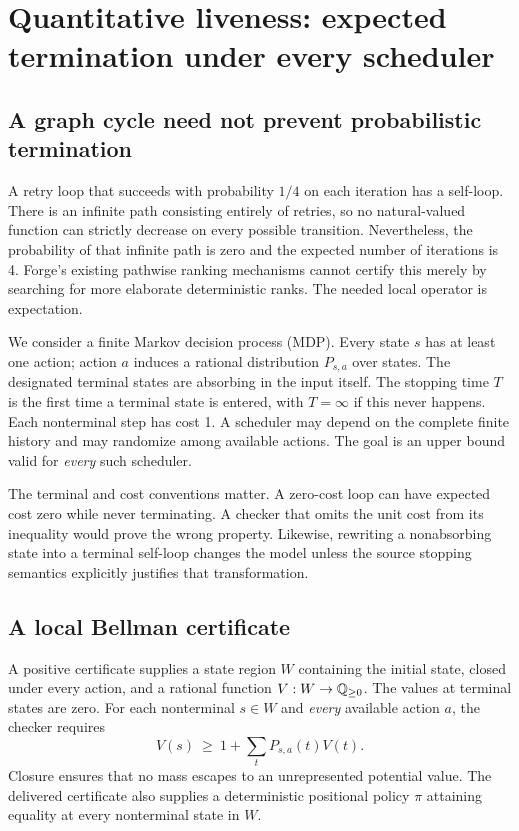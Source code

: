 \section{Quantitative liveness: expected termination under every scheduler}
\label{sec:bellman}

\subsection{A graph cycle need not prevent probabilistic termination}

A retry loop that succeeds with probability $1/4$ on each iteration has a
self-loop. There is an infinite path consisting entirely of retries, so no
natural-valued function can strictly decrease on every possible transition.
Nevertheless, the probability of that infinite path is zero and the expected
number of iterations is 4. Forge's existing pathwise ranking mechanisms cannot
certify this merely by searching for more elaborate deterministic ranks.
The needed local operator is expectation.

We consider a finite Markov decision process (MDP). Every state $s$ has at least
one action; action $a$ induces a rational distribution $P_{s,a}$ over states.
The designated terminal states are absorbing in the input itself. The stopping
time $T$ is the first time a terminal state is entered, with $T=\infty$ if
this never happens. Each nonterminal step has cost 1. A scheduler may depend
on the complete finite history and may randomize among available actions.
The goal is an upper bound valid for \emph{every} such scheduler.

The terminal and cost conventions matter. A zero-cost loop can have expected
cost zero while never terminating. A checker that omits the unit cost from its
inequality would prove the wrong property. Likewise, rewriting a nonabsorbing
state into a terminal self-loop changes the model unless the source stopping
semantics explicitly justifies that transformation.

\subsection{A local Bellman certificate}

A positive certificate supplies a state region $W$ containing the initial
state, closed under every action, and a rational function $V:W\to\mathbb{Q}_{\ge0}$.
The values at terminal states are zero. For each nonterminal $s\in W$ and
\emph{every} available action $a$, the checker requires
\begin{equation}
 V(s)\ \ge\ 1+\sum_tP_{s,a}(t)V(t).
 \label{eq:bellman-upper}
\end{equation}
Closure ensures that no mass escapes to an unrepresented potential value.
The delivered certificate also supplies a deterministic positional policy
$\pi$ attaining equality at every nonterminal state in $W$.

